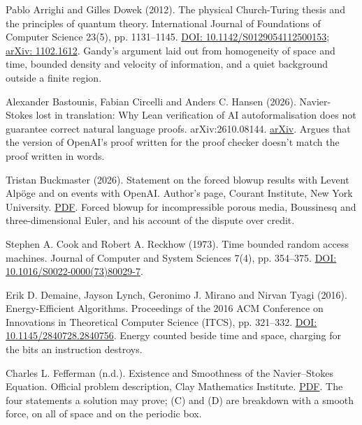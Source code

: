 \noindent Pablo Arrighi and Gilles Dowek (2012). The physical Church-Turing thesis and the principles of quantum theory. International Journal of Foundations of Computer Science 23(5), pp. 1131--1145. \href{https://doi.org/10.1142/S0129054112500153}{DOI: 10.1142/S0129054112500153}; \href{https://arxiv.org/abs/1102.1612}{arXiv: 1102.1612}. Gandy's argument laid out from homogeneity of space and time, bounded density and velocity of information, and a quiet background outside a finite region.
\par\medskip

\noindent Alexander Bastounis, Fabian Circelli and Anders C. Hansen (2026). Navier-Stokes lost in translation: Why Lean verification of AI autoformalisation does not guarantee correct natural language proofs. arXiv:2610.08144. \href{https://arxiv.org/abs/2610.08144}{arXiv}. Argues that the version of OpenAI's proof written for the proof checker doesn't match the proof written in words.
\par\medskip

\noindent Tristan Buckmaster (2026). Statement on the forced blowup results with Levent Alp\"oge and on events with OpenAI. Author's page, Courant Institute, New York University. \href{https://cims.nyu.edu/~tristanb/statement.pdf}{PDF}. Forced blowup for incompressible porous media, Boussinesq and three-dimensional Euler, and his account of the dispute over credit.
\par\medskip

\noindent Stephen A. Cook and Robert A. Reckhow (1973). Time bounded random access machines. Journal of Computer and System Sciences 7(4), pp. 354--375. \href{https://doi.org/10.1016/S0022-0000(73)80029-7}{DOI: 10.1016/S0022-0000(73)80029-7}.
\par\medskip

\noindent Erik D. Demaine, Jayson Lynch, Geronimo J. Mirano and Nirvan Tyagi (2016). Energy-Efficient Algorithms. Proceedings of the 2016 ACM Conference on Innovations in Theoretical Computer Science (ITCS), pp. 321--332. \href{https://doi.org/10.1145/2840728.2840756}{DOI: 10.1145/2840728.2840756}. Energy counted beside time and space, charging for the bits an instruction destroys.
\par\medskip

\noindent Charles L. Fefferman (n.d.). Existence and Smoothness of the Navier--Stokes Equation. Official problem description, Clay Mathematics Institute. \href{https://www.claymath.org/wp-content/uploads/2022/06/navierstokes.pdf}{PDF}. The four statements a solution may prove; (C) and (D) are breakdown with a smooth force, on all of space and on the periodic box.
\par\medskip

